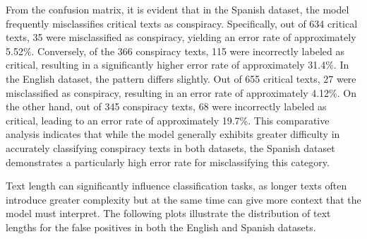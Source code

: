 \documentclass{Configuration_Files/PoliMi3i_thesis}
\begin{document}
From the confusion matrix, it is evident that in the Spanish dataset, the model frequently misclassifies critical texts as conspiracy. Specifically, out of 634 critical texts, 35 were misclassified as conspiracy, yielding an error rate of approximately 5.52\%. Conversely, of the 366 conspiracy texts, 115 were incorrectly labeled as critical, resulting in a significantly higher error rate of approximately 31.4\%. In the English dataset, the pattern differs slightly. Out of 655 critical texts, 27 were misclassified as conspiracy, resulting in an error rate of approximately 4.12\%. On the other hand, out of 345 conspiracy texts, 68 were incorrectly labeled as critical, leading to an error rate of approximately 19.7\%. This comparative analysis indicates that while the model generally exhibits greater difficulty in accurately classifying conspiracy texts in both datasets, the Spanish dataset demonstrates a particularly high error rate for misclassifying this category.

Text length can significantly influence classification tasks, as longer texts often introduce greater complexity but at the same time can give more context that the model must interpret. The following plots illustrate the distribution of text lengths for the false positives in both the English and Spanish datasets.
\end{document}

